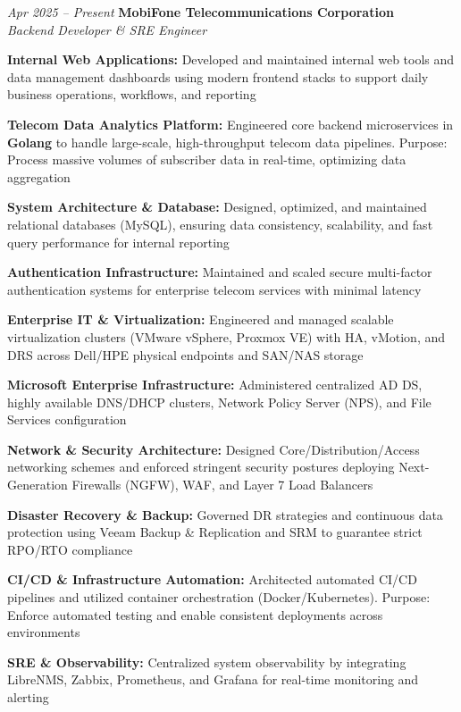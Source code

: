 \begin{twocolentry}{\textit{Apr 2025 -- Present}}
    \textbf{MobiFone Telecommunications Corporation} \\[4pt]
    \textit{Backend Developer \& SRE Engineer}
\end{twocolentry}
\begin{onecolentry}
    \begin{highlights}
        \item \textbf{Internal Web Applications:} Developed and maintained internal web tools and data management dashboards using modern frontend stacks to support daily business operations, workflows, and reporting
        \item \textbf{Telecom Data Analytics Platform:} Engineered core backend microservices in \textbf{Golang} to handle large-scale, high-throughput telecom data pipelines. Purpose: Process massive volumes of subscriber data in real-time, optimizing data aggregation
        \item \textbf{System Architecture \& Database:} Designed, optimized, and maintained relational databases (MySQL), ensuring data consistency, scalability, and fast query performance for internal reporting
        \item \textbf{Authentication Infrastructure:} Maintained and scaled secure multi-factor authentication systems for enterprise telecom services with minimal latency
        \item \textbf{Enterprise IT \& Virtualization:} Engineered and managed scalable virtualization clusters (VMware vSphere, Proxmox VE) with HA, vMotion, and DRS across Dell/HPE physical endpoints and SAN/NAS storage
        \item \textbf{Microsoft Enterprise Infrastructure:} Administered centralized AD DS, highly available DNS/DHCP clusters, Network Policy Server (NPS), and File Services configuration
        \item \textbf{Network \& Security Architecture:} Designed Core/Distribution/Access networking schemes and enforced stringent security postures deploying Next-Generation Firewalls (NGFW), WAF, and Layer 7 Load Balancers
        \item \textbf{Disaster Recovery \& Backup:} Governed DR strategies and continuous data protection using Veeam Backup \& Replication and SRM to guarantee strict RPO/RTO compliance
        \item \textbf{CI/CD \& Infrastructure Automation:} Architected automated CI/CD pipelines and utilized container orchestration (Docker/Kubernetes). Purpose: Enforce automated testing and enable consistent deployments across environments
        \item \textbf{SRE \& Observability:} Centralized system observability by integrating LibreNMS, Zabbix, Prometheus, and Grafana for real-time monitoring and alerting
    \end{highlights}
\end{onecolentry}
\vspace{0.2 cm}

